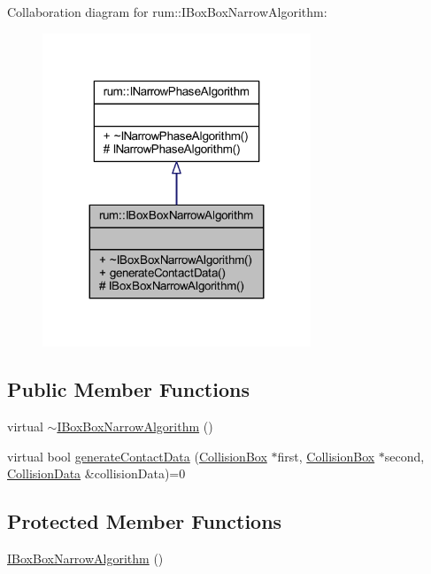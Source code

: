 Collaboration diagram for rum\+:\+:I\+Box\+Box\+Narrow\+Algorithm\+:\nopagebreak
\begin{figure}[H]
\begin{center}
\leavevmode
\includegraphics[width=227pt]{classrum_1_1_i_box_box_narrow_algorithm__coll__graph}
\end{center}
\end{figure}
\subsection*{Public Member Functions}
\begin{DoxyCompactItemize}
\item 
virtual \mbox{\hyperlink{classrum_1_1_i_box_box_narrow_algorithm_a5d576dc576dd5f73fa23a95f34ea22b7}{$\sim$\+I\+Box\+Box\+Narrow\+Algorithm}} ()
\item 
virtual bool \mbox{\hyperlink{classrum_1_1_i_box_box_narrow_algorithm_a9e35387b3c982ab0431fab9ceda5f6a6}{generate\+Contact\+Data}} (\mbox{\hyperlink{classrum_1_1_collision_box}{Collision\+Box}} $\ast$first, \mbox{\hyperlink{classrum_1_1_collision_box}{Collision\+Box}} $\ast$second, \mbox{\hyperlink{classrum_1_1_collision_data}{Collision\+Data}} \&collision\+Data)=0
\end{DoxyCompactItemize}
\subsection*{Protected Member Functions}
\begin{DoxyCompactItemize}
\item 
\mbox{\hyperlink{classrum_1_1_i_box_box_narrow_algorithm_abbdfd55897db3e4349463c8185c07bd2}{I\+Box\+Box\+Narrow\+Algorithm}} ()
\end{DoxyCompactItemize}


